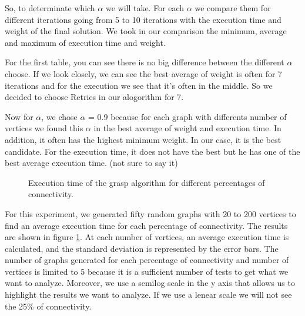 So, to determinate which $\alpha$ we will take. 
For each $\alpha$ we compare them  for different iterations going from 5 to 10 iterations with the execution time and weight of the final solution.
We took in our comparison the minimum, average and maximum of execution time and weight.

For the first table, you can see there is no big difference between the different $\alpha$ choose.
If we look closely, we can see the best average of weight is often for 7 iterations and for the execution we see that it's often in the middle.
So we decided to choose Retries in our alogorithm for 7.
\bigskip

Now for $\alpha$, we chose $\alpha$ = 0.9 because for each graph with differents number of vertices we found this $\alpha$ in the best average of weight and execution time.
In addition, it often has the highest  minimum weight. In our case, it is the best candidate.
For the execution time, it does not have the best but he has one of the best average execution time.  (not sure to say it)


\begin{figure}[H]
    \centering
    \caption{Execution time of the grasp algorithm for different percentages of connectivity.}
    \label{fig:grasp_time}
\end{figure}

For this experiment, we generated fifty random graphs with 20 to 200 vertices to
find an average execution time for each percentage of connectivity. The results
are shown in figure \ref{fig:grasp_time}. At each number of vertices, an average
execution time is calculated, and the standard deviation is represented by the
error bars. The number of graphs generated for each
percentage of connectivity and number of vertices is limited to 5 because it is a sufficient
number of tests to get what we want to analyze. Moreover, we use a semilog scale in the y axis that allows
us to highlight the results we want to analyze. If we use a lenear scale we will not see the 25\% of connectivity.
